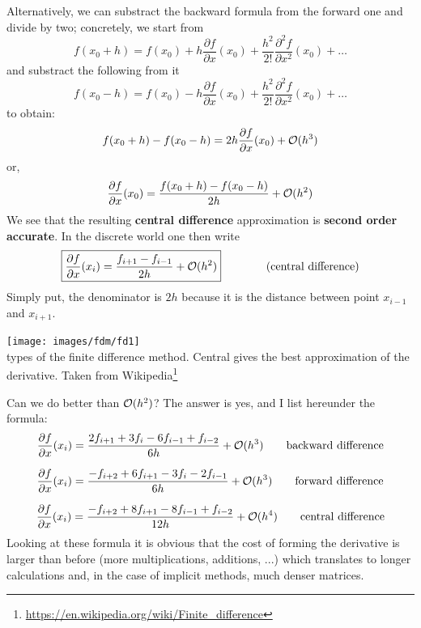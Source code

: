 Alternatively, we can substract the backward formula from the forward one 
and divide by two; concretely, we start from 
\begin{equation}
f(x_0+h)=f(x_0)+ 
h \frac{\partial f}{\partial x}(x_0)  + 
\frac{h^2}{2!} \frac{\partial^2 f}{\partial x^2}(x_0)  + \dots  
\end{equation}
and substract the following from it
\begin{equation}
f(x_0-h)=f(x_0)-
h \frac{\partial f}{\partial x}(x_0)  + 
\frac{h^2}{2!} \frac{\partial^2 f}{\partial x^2}(x_0)  + \dots 
\end{equation}
to obtain:
\begin{equation}
f(x_0+h)-f(x_0-h) = 2h \frac{\partial f}{\partial x}(x_0)  +{\cal O}(h^3) 
\end{equation}
or, 
\[
\frac{\partial f}{\partial x}(x_0)  = \frac{ f(x_0+h)-f(x_0-h)}{2h} +{\cal O}(h^2) 
\]
We see that the resulting {\bf central difference} approximation is 
{\bf second order accurate}. In the discrete world one then write
\begin{equation}
\boxed{
\frac{\partial f}{\partial x}(x_i) 
= \frac{f_{i+1}-f_{i-1}}{2h} + {\cal O}(h^2)
}
\qquad
\qquad
\text{(central difference)} 
\end{equation}
Simply put, the denominator is $2h$ because it is the distance between point $x_{i-1}$ and $x_{i+1}$.


\begin{center}
\texttt{[image: images/fdm/fd1]}\\
{ types of the finite difference method. Central gives the best approximation of the derivative.
Taken from Wikipedia\footnote{\url{https://en.wikipedia.org/wiki/Finite_difference}}
}
\end{center}

Can we do better than ${\cal O}(h^2)$? The answer is yes, and I list hereunder the 
formula:
\begin{equation}
\frac{\partial f}{\partial x}(x_i) 
= \frac{2 f_{i+1} + 3 f_i - 6 f_{i-1} + f_{i-2}}{6 h} + {\cal O}(h^3)
\qquad
\text{backward difference}
\end{equation}

\begin{equation}
\frac{\partial f}{\partial x}(x_i) 
= \frac{-  f_{i+2} +6 f_{i+1} - 3 f_{i} -2 f_{i-1}}{6 h} + {\cal O}(h^3)
\qquad
\text{forward difference}
\end{equation}

\begin{equation}
\frac{\partial f}{\partial x}(x_i) 
= \frac{-  f_{i+2} +8 f_{i+1} - 8 f_{i-1} + f_{i-2}}{12 h} + {\cal O}(h^4)
\qquad
\text{central difference}
\end{equation}
Looking at these formula it is obvious that the cost of forming the derivative 
is larger than before (more multiplications, additions, ...) which translates
to longer calculations and, in the case of implicit methods, much denser matrices. 


